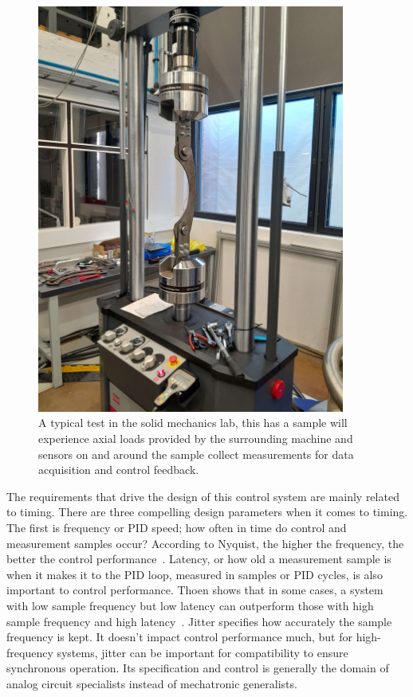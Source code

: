 \documentclass[english,12pt,a4paper,pdftex,eng,utf8]{aaltothesis}
\begin{document}
\begin{figure}[h]
  \centering
  \includegraphics[width=0.90\textwidth]{assets/solid_mechanics_test_rig}
  \caption{A typical test in the solid mechanics lab, this has a sample will experience axial loads provided by the surrounding machine and sensors on and around the sample collect measurements for data acquisition and control feedback.}\label{fig:solid_mechanics_test_rig}
\end{figure}

The requirements that drive the design of this control system are mainly related to timing.  There are three compelling design parameters when it comes to timing.  The first is frequency or PID speed; how often in time do control and measurement samples occur?  According to Nyquist, the higher the frequency, the better the control performance~\cite{Nyquist1928}.  Latency, or how old a measurement sample is when it makes it to the PID loop, measured in samples or PID cycles, is also important to control performance.  Thoen shows that in some cases, a system with low sample frequency but low latency can outperform those with high sample frequency and high latency~\cite{Thoen2021}.  Jitter specifies how accurately the sample frequency is kept.  It doesn't impact control performance much, but for high-frequency systems, jitter can be important for compatibility to ensure synchronous operation.  Its specification and control is generally the domain of analog circuit specialists instead of mechatronic generalists.
\end{document}
